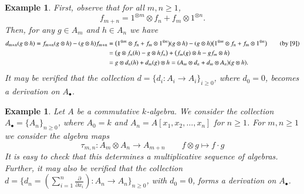 \documentclass[10pt, colorlinks]{article}
\numberwithin{equation}{section} \DeclareMathSizes{2}{10}{12}{13}
\newtheorem{eg}[thm]{Example}
\begin{document}
\begin{eg}
    First, observe that for all $m,n\geq 1$,
    \begin{equation}\label{9}
        f_{m+n}=1^{\otimes{m}}\otimes f_n+f_m\otimes 1^{\otimes{n}}.
    \end{equation}
    Then, for any $g\in A_{{m}}$ and $h\in A_{{n}}$ we have 
    \begin{align}
        d_{m+n}(g\otimes h)=f_{m+n}(g\otimes h)-(g\otimes h)f_{m+n}
        &=\big(1^{\otimes{m}}\otimes f_n+f_m\otimes 1^{\otimes{n}}\big)(g\otimes h)-(g\otimes h)\big(1^{\otimes{m}}\otimes f_n+f_m\otimes 1^{\otimes{n}}\big)\tag{by \eqref{9}}\\
        &=\big(g\otimes f_n(h)-g\otimes hf_n\big)+\big(f_m(g)\otimes h-gf_m\otimes h\big)\notag\\
        &=g\otimes d_n(h)+d_m(g)\otimes h
        =(A_m\otimes d_n+d_{m}\otimes A_n)(g\otimes h).\notag
    \end{align}
    \fi
  \emph{It may be verified that the collection $d=\{d_i:A_i\longrightarrow A_i\}_{i\geq 0}$, where $d_0=0$, becomes a derivation on $A_\bullet$.}
\end{eg}
\begin{eg}\label{eg2.6}
    \emph{Let $A$ be a commutative $k$-algebra. We consider the collection $A_\bullet=\{A_n\}_{n\geq 0}$, where $A_0=k$ and 
        $A_n=A[x_1,x_2,\ldots,x_n]$ for ${ n\geq1}$. For $m,n\geq 1$ we consider the algebra maps}
        \begin{equation*}
            \tau_{m,n}:A_m\otimes A_n\longrightarrow A_{m+n}\qquad f\otimes g\longmapsto f\cdot g
        \end{equation*}
     \emph{It is easy to check that this determines a multiplicative sequence of algebras. 
        Further, it may also be verified that the collection $d=\big\{d_n=(\sum_{i=1}^n\frac{ \partial}{\partial x_i}):A_n\longrightarrow A_n\big\}_{n\geq 0}$, with $d_0=0$, forms a derivation on ${A}_\bullet$.}

\end{eg}
\end{document}
